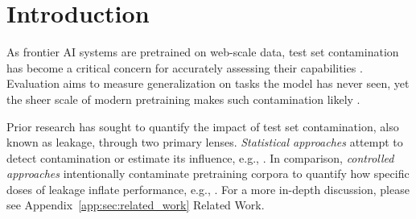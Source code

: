 \section{Introduction}
\label{sec:introduction}

As frontier AI systems are pretrained on web-scale data, test set contamination has become a critical concern for accurately assessing their capabilities \citep{sainz2023nlp,schaeffer2023pretrainingtestsetneed,xu2024benchmarkdatacontaminationlarge,deng2024unveiling,reuel2025open}. %
Evaluation aims to measure generalization on tasks the model has never seen, yet the sheer scale of modern pretraining makes such contamination likely \citep{brown2020language, du2022glam, wei2022finetuned,chowdhery2022palmscalinglanguagemodeling,touvron2023llama2openfoundation, penedo2024finewebdatasetsdecantingweb}.

Prior research has sought to quantify the impact of test set contamination, also known as leakage, through two primary lenses. \textit{Statistical approaches} attempt to detect contamination or estimate its influence, e.g., \citep{oren2023proving, ni2025trainingbenchmarkneed, shi2024detecting, golchin2023data,golchin2024time,roberts2024to, wang2025generalization, zhang2024carefulexaminationlargelanguage}.
In comparison, \textit{controlled approaches} intentionally contaminate pretraining corpora to quantify how specific doses of leakage inflate performance, e.g., \citep{magar2022data,jiang2024investigatingdatacontaminationpretraining,oren2023proving,yao2024data, duan2024membership,wang2025generalization,kocyigit2025overestimation,bordt2025howmuch, wei2025hubblemodelsuiteadvance}.
For a more in-depth discussion, please see Appendix~\ref{app:sec:related_work} Related Work.

